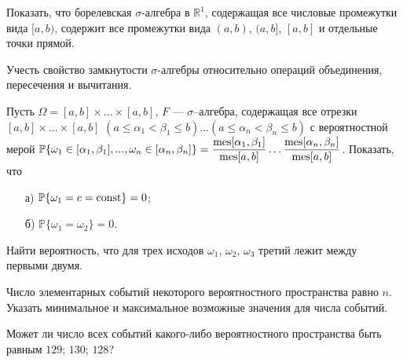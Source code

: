 
\begin{problem}
Показать, что борелевская $\sigma$-алгебра в ${\mathbb R}^1$, содержащая все числовые промежутки вида $[a,b)$, 
содержит все промежутки вида $(a,b)$, $(a,b]$, $[a,b]$ и отдельные точки прямой. 

\begin{ordre}
Учесть свойство замкнутости $\sigma$-алгебры относительно операций 
объединения, пересечения и вычитания. 
\end{ordre}

\end{problem}


\begin{problem}
Пусть $\Omega = [a,b]\times...\times[a,b]$, $F$ --- $\sigma$–алгебра, содержащая все отрезки 
$[a,b]\times...\times[a,b]$ $(a \leqslant \alpha_1 < \beta_1 \leqslant b) ... (a \leqslant \alpha_n < \beta_n \leqslant b)$ с вероятностной мерой 
${\mathbb P}\{ \omega_1  \in [\alpha_1,\beta_1], ..., \omega_n  \in [\alpha_n,\beta_n]  \}=\dfrac{\mathrm{mes}[\alpha_1, \beta_1]}{\mathrm{mes}[a,b]}  \ldots  \dfrac{\mathrm{mes}[\alpha_n, \beta_n]}{\mathrm{mes}[a,b]}$. 
Показать, что 
\begin{enumerate}
\item[а)] ${\mathbb P}\{ \omega_1=c=\mathop{\mathrm{const}}\nolimits\}=0$; 
\item[б)] ${\mathbb P}\{ \omega_1=\omega_2\}=0$. 
\end{enumerate}
Найти вероятность, что для трех исходов $\omega_1$, $\omega_2$, $\omega_3$ третий лежит между первыми двумя. 
\end{problem}


\begin{problem}
Число элементарных событий некоторого вероятностного пространства равно $n$. Указать минимальное и максимальное возможные значения 
для числа событий. 
\end{problem}

\begin{problem}
Может ли число всех событий какого-либо вероятностного пространства быть равным $129$; $130$; $128$? 
\end{problem}


